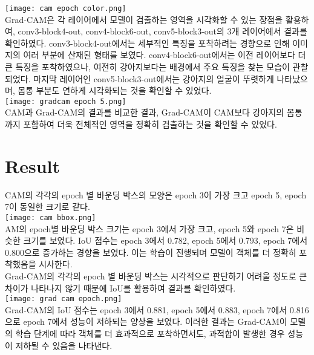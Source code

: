 \documentclass[twocolumn]{article}
\begin{document}
\texttt{[image: cam epoch color.png]}\\

Grad-CAM은 각 레이어에서 모델이 검출하는 영역을 시각화할 수 있는 장점을 활용하여, conv3-block4-out, conv4-block6-out, conv5-block3-out의 3개 레이어에서 결과를 확인하였다.
conv3-block4-out에서는 세부적인 특징을 포착하려는 경향으로 인해 이미지의 여러 부분에 산재된 형태를 보였다.
conv4-block6-out에서는 이전 레이어보다 더 큰 특징을 포착하였으나, 여전히 강아지보다는 배경에서 주요 특징을 찾는 모습이 관찰되었다.
마지막 레이어인 conv5-block3-out에서는 강아지의 얼굴이 뚜렷하게 나타났으며, 몸통 부분도 연하게 시각화되는 것을 확인할 수 있었다.\\

\texttt{[image: gradcam epoch 5.png]}\\

CAM과 Grad-CAM의 결과를 비교한 결과, Grad-CAM이 CAM보다 강아지의 몸통까지 포함하여 더욱 전체적인 영역을 정확히 검출하는 것을 확인할 수 있었다.\\
\section{Result}

CAM의 각각의 epoch 별 바운딩 박스의 모양은 epoch 3이 가장 크고 epoch 5, epoch 7이 동일한 크기로 같다.\\

\texttt{[image: cam bbox.png]}\\

AM의 epoch별 바운딩 박스 크기는 epoch 3에서 가장 크고, epoch 5와 epoch 7은 비슷한 크기를 보였다.
IoU 점수는 epoch 3에서 0.782, epoch 5에서 0.793, epoch 7에서 0.800으로 증가하는 경향을 보였다.
이는 학습이 진행되며 모델이 객체를 더 정확히 포착했음을 시사한다.\\

Grad-CAM의 각각의 epoch 별 바운딩 박스는 시각적으로 판단하기 어려울 정도로 큰 차이가 나타나지 않기 때문에 IoU를 활용하여 결과를 확인하였다.\\

\texttt{[image: grad cam epoch.png]}\\

Grad-CAM의 IoU 점수는 epoch 3에서 0.881, epoch 5에서 0.883, epoch 7에서 0.816으로 epoch 7에서 성능이 저하되는 양상을 보였다.
이러한 결과는 Grad-CAM이 모델의 학습 단계에 따라 객체를 더 효과적으로 포착하면서도, 과적합이 발생한 경우 성능이 저하될 수 있음을 나타낸다.
\end{document}
